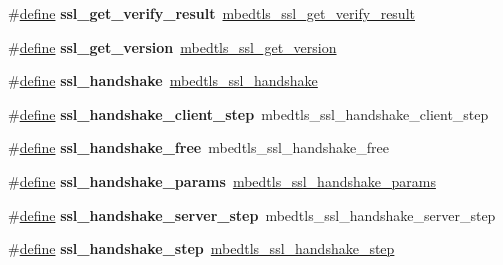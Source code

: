 \begin{DoxyCompactItemize}
\#\hyperlink{structdefine}{define} {\bfseries ssl\+\_\+get\+\_\+verify\+\_\+result}~\hyperlink{ssl_8h_a516064f1468d459159ef7cd6c496a026}{mbedtls\+\_\+ssl\+\_\+get\+\_\+verify\+\_\+result}
\item 
\mbox{\label{compat-1_83_8h_a12bd469fdb2bc9364ea66afc3c5ca39a}} 
\#\hyperlink{structdefine}{define} {\bfseries ssl\+\_\+get\+\_\+version}~\hyperlink{ssl_8h_a1ee2e52fe2ae9620af84df97a0347ce3}{mbedtls\+\_\+ssl\+\_\+get\+\_\+version}
\item 
\mbox{\label{compat-1_83_8h_a06d9483f9ebf6729e238de23a9472beb}} 
\#\hyperlink{structdefine}{define} {\bfseries ssl\+\_\+handshake}~\hyperlink{ssl_8h_a4a37e497cd08c896870a42b1b618186e}{mbedtls\+\_\+ssl\+\_\+handshake}
\item 
\mbox{\label{compat-1_83_8h_a6772a29969331d9c91c49ed9e8d994bf}} 
\#\hyperlink{structdefine}{define} {\bfseries ssl\+\_\+handshake\+\_\+client\+\_\+step}~mbedtls\+\_\+ssl\+\_\+handshake\+\_\+client\+\_\+step
\item 
\mbox{\label{compat-1_83_8h_a1ad21481fc277bd6e9a4fa7bda1be04e}} 
\#\hyperlink{structdefine}{define} {\bfseries ssl\+\_\+handshake\+\_\+free}~mbedtls\+\_\+ssl\+\_\+handshake\+\_\+free
\item 
\mbox{\label{compat-1_83_8h_a1f12209e56f43b407e99753fe4a50d7e}} 
\#\hyperlink{structdefine}{define} {\bfseries ssl\+\_\+handshake\+\_\+params}~\hyperlink{structmbedtls__ssl__handshake__params}{mbedtls\+\_\+ssl\+\_\+handshake\+\_\+params}
\item 
\mbox{\label{compat-1_83_8h_ae8861b0669933a2358ebd4fb3e546423}} 
\#\hyperlink{structdefine}{define} {\bfseries ssl\+\_\+handshake\+\_\+server\+\_\+step}~mbedtls\+\_\+ssl\+\_\+handshake\+\_\+server\+\_\+step
\item 
\mbox{\label{compat-1_83_8h_a597171e7375b9e201b18cc7b304b66b0}} 
\#\hyperlink{structdefine}{define} {\bfseries ssl\+\_\+handshake\+\_\+step}~\hyperlink{ssl_8h_aac1583fe56eda081580742999968bbcf}{mbedtls\+\_\+ssl\+\_\+handshake\+\_\+step}
\item 
\mbox{\label{compat-1_83_8h_ade8d562d6be1b8cda3bbb7e2b352d356}} 

\end{DoxyCompactItemize}
